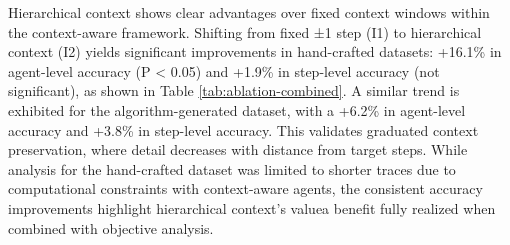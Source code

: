 \documentclass{article}
\begin{document}
Hierarchical context shows clear advantages over fixed context windows within the context-aware framework. Shifting from fixed ±1 step (I1) to hierarchical context (I2) yields significant improvements in hand-crafted datasets: +16.1\% in agent-level accuracy (P < 0.05) and +1.9\% in step-level accuracy (not significant), as shown in Table \ref{tab:ablation-combined}. A similar trend is exhibited for the algorithm-generated dataset, with a +6.2\% in agent-level accuracy and +3.8\% in step-level accuracy.  This validates graduated context preservation, where detail decreases with distance from target steps. While analysis for the hand-crafted dataset was limited to shorter traces due to computational constraints with context-aware agents, the consistent accuracy improvements highlight hierarchical context's value\textemdash a benefit fully realized when combined with objective analysis.
\end{document}
